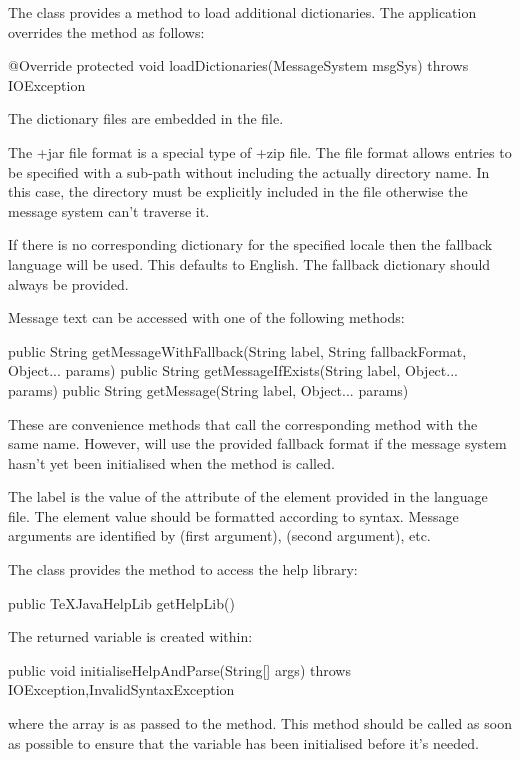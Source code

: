 \documentclass[toc=listof]{scrreport}
\begin{document}
The  class provides a method to load additional
dictionaries. The  application overrides the
method as follows:
\begin{codebox}
@Override
protected void loadDictionaries(MessageSystem msgSys)
throws IOException
\end{codebox}
The dictionary files  are embedded
in the  file.

\begin{important}
The \ext+{jar} file format is a special type of \ext+{zip} file.
The file format allows entries to be specified with a sub-path
without including the actually directory name. In this case,
the  directory must be explicitly included in
the  file otherwise the message system can't traverse it.
\end{important}

If there is no corresponding dictionary for the specified locale
then the fallback language will be used. This defaults to English.
The fallback dictionary should always be provided.

Message text can be accessed with one of the following
 methods:
\begin{codebox}
public String getMessageWithFallback(String label,
   String fallbackFormat, Object... params)
public String getMessageIfExists(String label, Object... params)
public String getMessage(String label, Object... params)
\end{codebox}
These are convenience methods that call the corresponding
 method with the same name. However,
 will use the provided fallback format
if the message system hasn't yet been initialised when the method is called.

The label is the value of the  attribute of the
 element provided in the language file.
The element value should be formatted according to
 syntax. Message arguments are
identified by  (first argument), 
 (second argument), etc.

The  class provides the method to access the help
library:
\begin{codebox}
public TeXJavaHelpLib getHelpLib()
\end{codebox}
The returned  variable is created within:
\begin{codebox}
public void initialiseHelpAndParse(String[] args)
throws IOException,InvalidSyntaxException
\end{codebox}
where the  array is as passed to the  method.
This method should be called as soon as possible to ensure that the
 variable has been initialised before it's needed. 
\end{document}
